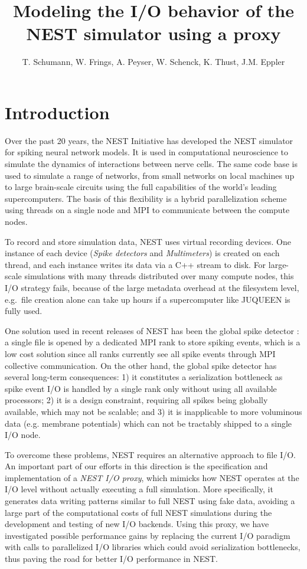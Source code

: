 \documentclass[]{YIC2015}
\title{Modeling the I/O behavior of the NEST simulator using a proxy}
\author[T. Schumann et al.]{%
  T. Schumann\authref{a}\corref,
  W. Frings\authref{b},
  A. Peyser\authref{c},
  W. Schenck\authref{c},
  K. Thust\authref{b},
  J.M. Eppler\authref{c}
}
\begin{document}
\maketitle

\section{Introduction}
%
Over the past 20 years, the NEST Initiative \cite{NESTInitiative} has
developed the NEST simulator \cite{NEST} for spiking neural network
models. It is used in computational neuroscience to simulate the
dynamics of interactions between nerve cells. The same code base is
used to simulate a range of networks, from small networks on local
machines up to large brain-scale circuits using the full capabilities
of the world's leading supercomputers. The basis of this flexibility
is a hybrid parallelization scheme using threads on a single node and
MPI \cite{mpi} to communicate between the compute nodes.

To record and store simulation data, NEST uses virtual recording
devices. One instance of each device (\emph{Spike detectors}
and \emph{Multimeters}) is created on each thread, and each instance
writes its data via a C++ stream to disk. For large-scale simulations
with many threads distributed over many compute nodes, this I/O
strategy fails, because of the large metadata overhead at the
filesystem level, e.g.~file creation alone can take up hours if a
supercomputer like JUQUEEN is fully used.

One solution used in recent releases of NEST has been the global spike
detector \cite{gsd}: a single file is opened by a dedicated MPI rank to
store spiking events, which is a low cost solution since all ranks
currently see all spike events through MPI collective communication.
On the other hand, the global spike detector has several long-term
consequences: 1) it constitutes a serialization bottleneck as spike
event I/O is handled by a single rank only without using all available
processors; 2) it is a design constraint, requiring all spikes being
globally available, which may not be scalable; and 3) it is
inapplicable to more voluminous data (e.g. membrane potentials) which
can not be tractably shipped to a single I/O node.

To overcome these problems, NEST requires an alternative approach to
file I/O. An important part of our efforts in this direction is the
specification and implementation of a \emph{NEST I/O proxy}, which
mimicks how NEST operates at the I/O level without actually executing
a full simulation. More specifically, it generates data writing
patterns similar to full NEST using fake data, avoiding a large part
of the computational costs of full NEST simulations during the
development and testing of new I/O backends. Using this proxy, we
have investigated possible performance gains by replacing the current I/O
paradigm with calls to parallelized I/O libraries which could avoid
serialization bottlenecks, thus paving the road for better I/O
performance in NEST.
\end{document}
